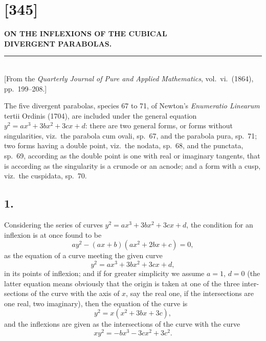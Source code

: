 \documentclass[11pt,a4paper]{article}
\theoremstyle{definition}
\begin{document}
\section*{[345]}

\begin{center}
{\large\bfseries ON THE INFLEXIONS OF THE CUBICAL}\\[4pt]
{\large\bfseries DIVERGENT PARABOLAS.}\\[8pt]
\rule{0.5\textwidth}{0.4pt}\\[6pt]
{\small [From the \textit{Quarterly Journal of Pure and Applied Mathematics}, vol.~vi.\ (1864),}\\
{\small pp.~199--208.]}
\end{center}

\vspace{0.5em}

The five divergent parabolas, species 67 to 71, of Newton's \textit{Enumeratio Linearum}
tertii Ordinis (1704), are included under the general equation $y^{2} = ax^{3} + 3bx^{2} + 3cx + d$:
there are two general forms, or forms without singularities, viz.\ the parabola cum ovali,
sp.~67, and the parabola pura, sp.~71; two forms having a double point, viz.\ the nodata,
sp.~68, and the punctata, sp.~69, according as the double point is one with real or
imaginary tangents, that is according as the singularity is a crunode or an acnode; and
a form with a cusp, viz.\ the cuspidata, sp.~70.

\subsection*{1.}

Considering the series of curves $y^{2} = ax^{3} + 3bx^{2} + 3cx + d$, the condition for an inflexion
is at once found to be
\[
ay^{2} - (ax + b)(ax^{2} + 2bx + c) = 0,
\]
as the equation of a curve meeting the given curve
\[
y^{2} = ax^{3} + 3bx^{2} + 3cx + d,
\]
in its points of inflexion; and if for greater simplicity we assume $a = 1$, $d = 0$ (the
latter equation means obviously that the origin is taken at one of the three inter-
sections of the curve with the axis of $x$, say the real one, if the intersections are
one real, two imaginary), then the equation of the curve is
\[
y^{2} = x(x^{2} + 3bx + 3c),
\]
and the inflexions are given as the intersections of the curve with the curve
\[
xy^{2} = -bx^{3} - 3cx^{2} + 3c^{2}.
\]
\end{document}
